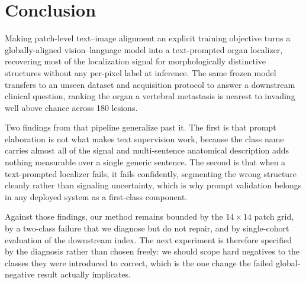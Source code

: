 \section{Conclusion}
\label{sec:conclusion}

Making patch-level text--image alignment an explicit training objective turns a
globally-aligned vision--language model into a text-prompted organ localizer,
recovering most of the localization signal for morphologically distinctive
structures without any per-pixel label at inference. The same frozen model
transfers to an unseen dataset and acquisition protocol to answer a downstream
clinical question, ranking the organ a vertebral metastasis is nearest to
invading well above chance across 180 lesions.

Two findings from that pipeline generalize past it. The first is that prompt
elaboration is not what makes text supervision work, because the class name
carries almost all of the signal and multi-sentence anatomical description adds
nothing measurable over a single generic sentence. The second is that when a
text-prompted localizer fails, it fails confidently, segmenting the wrong
structure cleanly rather than signaling uncertainty, which is why prompt
validation belongs in any deployed system as a first-class component.

Against those findings, our method remains bounded by the $14\times14$ patch
grid, by a two-class failure that we diagnose but do not repair, and by
single-cohort evaluation of the downstream index. The next experiment is
therefore specified by the diagnosis rather than chosen freely: we should scope
hard negatives to the classes they were introduced to correct, which is the one
change the failed global-negative result actually implicates.
